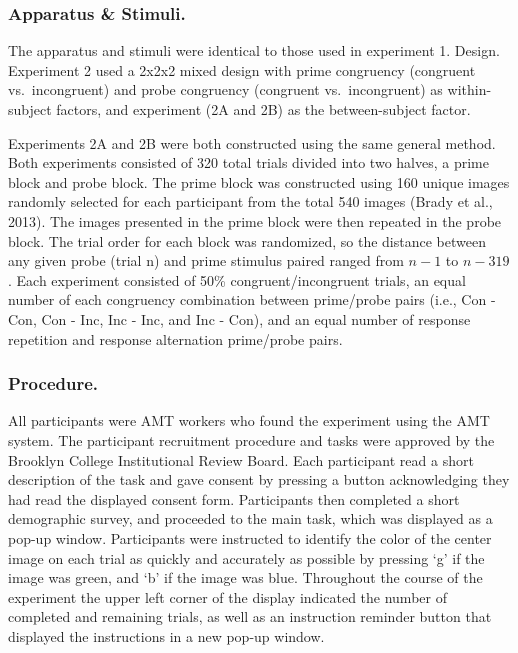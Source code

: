 \documentclass[]{DissertateCUNY}
\begin{document}
\hypertarget{apparatus-stimuli.-1}{%
\subsubsection{Apparatus \& Stimuli.}\label{apparatus-stimuli.-1}}

The apparatus and stimuli were identical to those used in experiment 1.
Design. Experiment 2 used a 2x2x2 mixed design with prime congruency
(congruent vs.~incongruent) and probe congruency (congruent
vs.~incongruent) as within-subject factors, and experiment (2A and 2B)
as the between-subject factor.

Experiments 2A and 2B were both constructed using the same general
method. Both experiments consisted of 320 total trials divided into two
halves, a prime block and probe block. The prime block was constructed
using 160 unique images randomly selected for each participant from the
total 540 images (Brady et al., 2013). The images presented in the prime
block were then repeated in the probe block. The trial order for each
block was randomized, so the distance between any given probe (trial n)
and prime stimulus paired ranged from \(n-1\) to \(n-319\). Each
experiment consisted of 50\% congruent/incongruent trials, an equal
number of each congruency combination between prime/probe pairs (i.e.,
Con - Con, Con - Inc, Inc - Inc, and Inc - Con), and an equal number of
response repetition and response alternation prime/probe pairs.

\hypertarget{procedure.-1}{%
\subsubsection{Procedure.}\label{procedure.-1}}

All participants were AMT workers who found the experiment using the AMT
system. The participant recruitment procedure and tasks were approved by
the Brooklyn College Institutional Review Board. Each participant read a
short description of the task and gave consent by pressing a button
acknowledging they had read the displayed consent form. Participants
then completed a short demographic survey, and proceeded to the main
task, which was displayed as a pop-up window. Participants were
instructed to identify the color of the center image on each trial as
quickly and accurately as possible by pressing `g' if the image was
green, and `b' if the image was blue. Throughout the course of the
experiment the upper left corner of the display indicated the number of
completed and remaining trials, as well as an instruction reminder
button that displayed the instructions in a new pop-up window.
\end{document}
